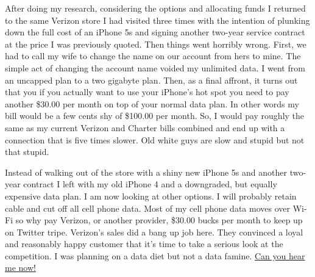 After doing my research, considering the options and allocating funds I
returned to the same Verizon store I had visited three times with the
intention of plunking down the full cost of an iPhone 5s and signing
another two-year service contract at the price I was previously quoted.
Then things went horribly wrong. First, we had to call my wife to change
the name on our account from hers to mine. The simple act of changing
the account name voided my unlimited data. I went from an uncapped plan
to a two gigabyte plan. Then, as a final affront, it turns out that you
if you actually want to use your iPhone's hot spot you need to pay
another \$30.00 per month on top of your normal data plan. In other
words my bill would be a few cents shy of \$100.00 per month. So, I
would pay roughly the same as my current Verizon and Charter bills
combined and end up with a connection that is five times slower. Old
white guys are slow and stupid but not that stupid.

Instead of walking out of the store with a shiny new iPhone 5s and
another two-year contract I left with my old iPhone 4 and a downgraded,
but equally expensive data plan. I am now looking at other options. I
will probably retain cable and cut off all cell phone data. Most of my
cell phone data moves over Wi-Fi so why pay Verizon, or another
provider, \$30.00 bucks per month to keep up on Twitter tripe. Verizon's
sales did a bang up job here. They convinced a loyal and reasonably
happy customer that it's time to take a serious look at the competition.
I was planning on a data diet but not a data famine.
\href{https://www.youtube.com/watch?v=XMblePw7eJs}{Can you hear me now!}

%



%